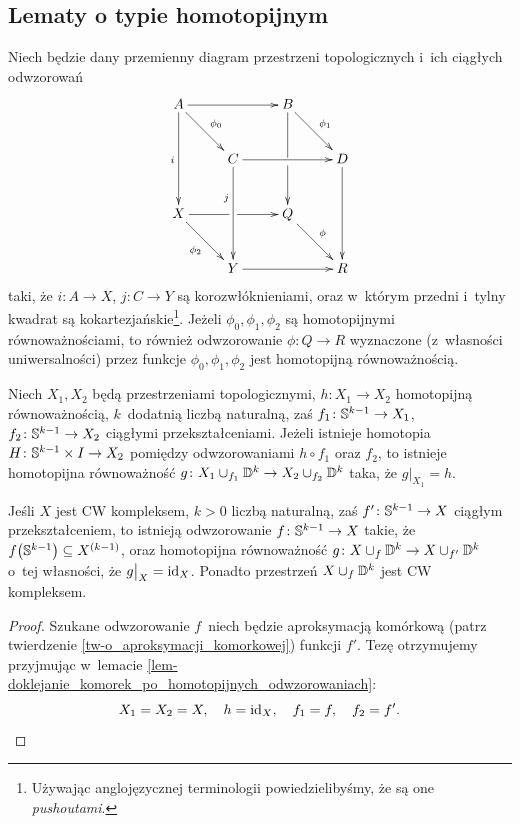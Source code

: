

\subsection{Lematy o typie homotopijnym}
\begin{lem}\label{lem-gluing_lemma_for_adjunction_spaces}
Niech będzie dany przemienny diagram przestrzeni topologicznych i~ich ciągłych odwzorowań 
\[
\xymatrix@!{
A \ar[rr]\ar[dd]_{i} & & B\ar'[d][dd]
\\
& C \ar@{<-}[ul]_{\phi_0}\ar[rr]\ar[dd]_(.35){j} & & D \ar@{<-}[ul]_{\phi_1}\ar[dd]
\\
X \ar'[r][rr] & & Q
\\
& Y \ar[rr]\ar@{<-}[ul]^{\phi_2} & & R \ar@{<-}[ul]_{\phi}
}
\]
taki, że $i\colon A\to X$, $j\colon C\to Y$ są korozwłóknieniami, oraz w~którym przedni i~tylny kwadrat są kokartezjańskie\footnote{Używając anglojęzycznej terminologii powiedzielibyśmy, że są one \textit{pushoutami}.}. Jeżeli $\phi_0,\phi_1,\phi_2$ są homotopijnymi równoważnościami, to również odwzorowanie $\phi\colon Q\to R$ wyznaczone (z~własności uniwersalności) przez funkcje $\phi_0,\phi_1,\phi_2$ jest homotopijną równoważnością.
\end{lem}

\begin{lem}\label{lem-doklejanie_komorek_po_homotopijnych_odwzorowaniach}
Niech $X_1,X_2$ będą przestrzeniami topologicznymi, $h\colon X_1\to X_2$ homotopijną równoważnością, $k$~dodatnią liczbą naturalną, zaś $f_1\colon \S^{k-1}\to X_1$, $f_2\colon \S^{k-1}\to X_2$ ciągłymi przekształceniami. Jeżeli istnieje homotopia $H\colon \S^{k-1}\times I\to X_2$ pomiędzy odwzorowaniami $h\circ f_1$ oraz $f_2$, to istnieje homotopijna równoważność $g\colon X_1\cup_{f_1}\D^{k}\to X_2\cup_{f_2}\D^k$ taka, że $g\big |_{X_1}=h$.
\end{lem}

\begin{lem}\label{lem-cw-kompleks-po-doklejeniu}
Jeśli $X$ jest CW kompleksem, $k>0$ liczbą naturalną, zaś $f'\colon \S^{k-1}\to X$ ciągłym przekształceniem, to istnieją odwzorowanie $f\colon \S^{k-1}\to X$ takie, że $f\bigl(\S^{k-1}\bigr)\subseteq X^{(k-1)}$, oraz homotopijna równoważność $g\colon X\cup_{f} \D^k \to X\cup_{f'} \D^k$ o~tej własności, że $g\big |_X=\id_X$. Ponadto przestrzeń $X\cup_{f} \D^k$ jest CW kompleksem.
\end{lem}
\begin{proof}
Szukane odwzorowanie $f$~niech będzie aproksymacją komórkową (patrz twierdzenie \ref{tw-o_aproksymacji_komorkowej}) funkcji $f'$. Tezę otrzymujemy przyjmując w~lemacie \ref{lem-doklejanie_komorek_po_homotopijnych_odwzorowaniach}: \[X_1=X_2=X,\quad h=\id_{X},\quad f_1=f,\quad f_2=f'.\qedhere\]
\end{proof}

